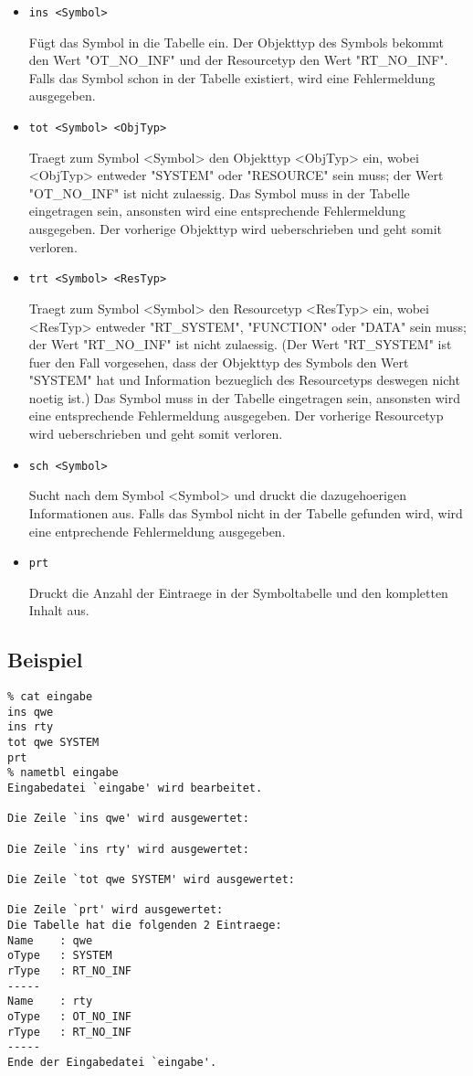 \begin{itemize}

\item {\tt ins <Symbol>}

F\"ugt das Symbol in die Tabelle ein.
Der Objekttyp des Symbols bekommt den Wert "OT\_NO\_INF" und der
Resourcetyp den Wert "RT\_NO\_INF".
Falls das Symbol schon in der Tabelle existiert, wird eine
Fehlermeldung ausgegeben. 

\item {\tt tot <Symbol> <ObjTyp>}

Traegt zum Symbol <Symbol> den Objekttyp <ObjTyp> ein,
wobei <ObjTyp> entweder "SYSTEM" oder "RESOURCE" sein muss; 
der Wert "OT\_NO\_INF" ist nicht zulaessig.
Das Symbol muss in der Tabelle eingetragen sein, ansonsten wird eine
entsprechende Fehlermeldung ausgegeben.
Der vorherige Objekttyp wird ueberschrieben und geht somit verloren.

\item {\tt trt <Symbol> <ResTyp>}

Traegt zum Symbol <Symbol> den Resourcetyp <ResTyp> ein,
wobei <ResTyp> entweder "RT\_SYSTEM", "FUNCTION" oder "DATA" sein
muss;
der Wert "RT\_NO\_INF" ist nicht zulaessig.
(Der Wert "RT\_SYSTEM" ist fuer den Fall vorgesehen, dass 
der Objekttyp des Symbols den Wert "SYSTEM" hat und Information
bezueglich des Resourcetyps deswegen nicht noetig ist.)
Das Symbol muss in der Tabelle eingetragen sein, ansonsten wird eine
entsprechende Fehlermeldung ausgegeben.
Der vorherige Resourcetyp wird ueberschrieben und geht somit verloren.

\item {\tt sch <Symbol>}

Sucht nach dem Symbol <Symbol> und druckt die dazugehoerigen
Informationen aus.
Falls das Symbol nicht in der Tabelle gefunden wird, wird eine
entprechende Fehlermeldung ausgegeben.

\item {\tt prt}

Druckt die Anzahl der Eintraege in der Symboltabelle und den kompletten
Inhalt aus.

\end{itemize}

\subsection*{Beispiel}
\begin{verbatim}
% cat eingabe
ins qwe
ins rty
tot qwe SYSTEM
prt
% nametbl eingabe
Eingabedatei `eingabe' wird bearbeitet.

Die Zeile `ins qwe' wird ausgewertet:

Die Zeile `ins rty' wird ausgewertet:

Die Zeile `tot qwe SYSTEM' wird ausgewertet:

Die Zeile `prt' wird ausgewertet:
Die Tabelle hat die folgenden 2 Eintraege:
Name    : qwe
oType   : SYSTEM
rType   : RT_NO_INF
-----
Name    : rty
oType   : OT_NO_INF
rType   : RT_NO_INF
-----
Ende der Eingabedatei `eingabe'.
\end{verbatim}

